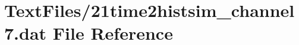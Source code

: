 \hypertarget{21time2histsim__channel7_8dat}{}\section{Text\+Files/21time2histsim\+\_\+channel7.dat File Reference}
\label{21time2histsim__channel7_8dat}
